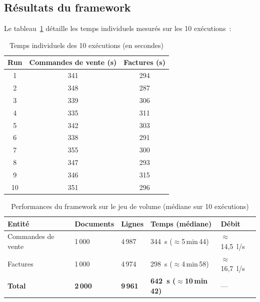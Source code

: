 \subsection{Résultats du framework}

Le tableau~\ref{tab:perf-runs} détaille les temps individuels mesurés sur les 10 exécutions~:

\begin{table}[H]
  \centering
  \renewcommand{\arraystretch}{1.3}
  \begin{tabular}{c c c}
    \toprule
    \rowcolor{gray!20}
    \textbf{Run} & \textbf{Commandes de vente (s)} & \textbf{Factures (s)} \\
    \midrule
    \rowcolor{gray!5}
    1  & 341 & 294 \\
    2  & 348 & 287 \\
    \rowcolor{gray!5}
    3  & 339 & 306 \\
    4  & 335 & 311 \\
    \rowcolor{gray!5}
    5  & 342 & 303 \\
    6  & 338 & 291 \\
    \rowcolor{gray!5}
    7  & 355 & 300 \\
    8  & 347 & 293 \\
    \rowcolor{gray!5}
    9  & 346 & 315 \\
    10 & 351 & 296 \\
    \bottomrule
  \end{tabular}
  \caption{Temps individuels des 10 exécutions (en secondes)}
  \label{tab:perf-runs}
\end{table}

\begin{table}[H]
  \centering
  \renewcommand{\arraystretch}{1.4}
  \begin{tabular}{p{3.5cm} p{2cm} p{2cm} p{3.5cm} p{2cm}}
    \toprule
    \rowcolor{gray!20}
    \textbf{Entité} & \textbf{Documents} & \textbf{Lignes} & \textbf{Temps (médiane)} & \textbf{Débit} \\
    \midrule
    \rowcolor{gray!5}
    Commandes de vente & 1\,000 & 4\,987 & 344~s ($\approx$5\,min\,44) & $\approx$14,5~l/s \\
    Factures           & 1\,000 & 4\,974 & 298~s ($\approx$4\,min\,58) & $\approx$16,7~l/s \\
    \rowcolor{gray!5}
    \textbf{Total}     & \textbf{2\,000} & \textbf{9\,961} & \textbf{642~s ($\approx$10\,min\,42)} & --- \\
    \bottomrule
  \end{tabular}
  \caption{Performances du framework sur le jeu de volume (médiane sur 10 exécutions)}
  \label{tab:perf-framework}
\end{table}

